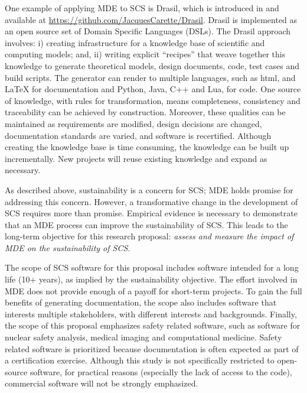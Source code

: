 \documentclass[12pt]{article}
\begin{document}
One example of applying MDE to SCS is Drasil, which is introduced in
\citet{SzymczakEtAl2016} and available at
\href{https://github.com/JacquesCarette/Drasil}
{https://github.com/JacquesCarette/Drasil}.  Drasil is implemented as an open
source set of Domain Specific Languages (DSLs).  The Drasil approach involves:
i) creating infrastructure for a knowledge base of scientific and computing
models; and, ii) writing explicit ``recipes'' that weave together this knowledge
to generate theoretical models, design documents, code, test cases and build
scripts. The generator can render to multiple languages, such as html, and LaTeX
for documentation and Python, Java, C++ and Lua, for code. One source of
knowledge, with rules for transformation, means completeness, consistency and
traceability can be achieved by construction. Moreover, these qualities can be
maintained as requirements are modified, design decisions are changed,
documentation standards are varied, and software is re­certified.  Although
creating the knowledge base is time consuming, the knowledge can be built up
incrementally.  New projects will reuse existing knowledge and expand as
necessary.

As described above, sustainability is a concern for SCS; MDE holds promise
for addressing this concern.  However, a transformative change in the
development of SCS requires more than promise.  Empirical evidence is necessary
to demonstrate that an MDE process can improve the sustainability of SCS.  This
leads to the long-term objective for this research proposal: \emph{assess and
  measure the impact of MDE on the sustainability of SCS.}

The scope of SCS software for this proposal includes software intended for a
long life (10+ years), as implied by the sustainability objective.  The effort
involved in MDE does not provide enough of a payoff for short-term projects.  To
gain the full benefits of generating documentation, the scope also includes
software that interests multiple stakeholders, with different interests and
backgrounds.  Finally, the scope of this proposal emphasizes safety related
software, such as software for nuclear safety analysis, medical imaging and
computational medicine.  Safety related software is prioritized because
documentation is often expected as part of a certification exercise.  Although
this study is not specifically restricted to open-source software, for practical
reasons (especially the lack of access to the code), commercial software will
not be strongly emphasized.
\end{document}
